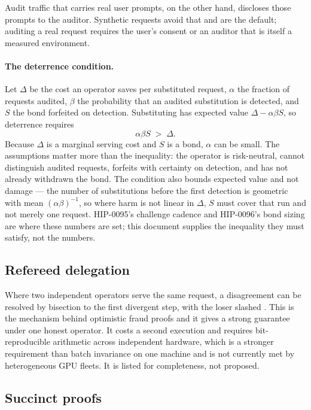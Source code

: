 \documentclass[11pt]{article}
\begin{document}
Audit traffic that carries real user prompts, on the other hand, discloses those prompts to the
auditor. Synthetic requests avoid that and are the default; auditing a real request requires the
user's consent or an auditor that is itself a measured environment.

\paragraph{The deterrence condition.}
Let $\Delta$ be the cost an operator saves per substituted request, $\alpha$ the fraction of requests
audited, $\beta$ the probability that an audited substitution is detected, and $S$ the bond forfeited
on detection. Substituting has expected value $\Delta - \alpha\beta S$, so deterrence requires
\[
\alpha \beta S \;>\; \Delta .
\]
Because $\Delta$ is a marginal serving cost and $S$ is a bond, $\alpha$ can be small. The assumptions
matter more than the inequality: the operator is risk-neutral, cannot distinguish audited requests,
forfeits with certainty on detection, and has not already withdrawn the bond. The condition also
bounds expected value and not damage --- the number of substitutions before the first detection is
geometric with mean $(\alpha\beta)^{-1}$, so where harm is not linear in $\Delta$, $S$ must cover
that run and not merely one request. HIP-0095's challenge cadence and HIP-0096's bond sizing are
where these numbers are set; this document supplies the inequality they must satisfy, not the
numbers.

\subsection{Refereed delegation}

Where two independent operators serve the same request, a disagreement can be resolved by bisection
to the first divergent step, with the loser slashed \cite{crr2011}. This is the mechanism behind
optimistic fraud proofs and it gives a strong guarantee under one honest operator. It costs a second
execution and requires bit-reproducible arithmetic across independent hardware, which is a stronger
requirement than batch invariance on one machine and is not currently met by heterogeneous GPU
fleets. It is listed for completeness, not proposed.

\subsection{Succinct proofs}
\end{document}
